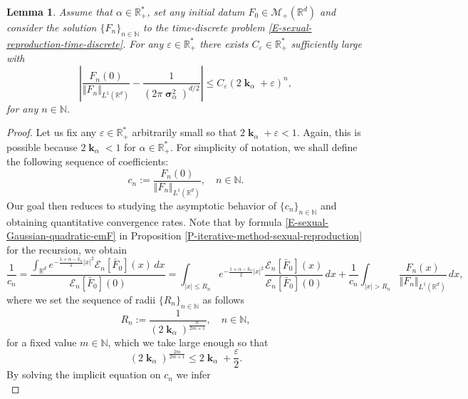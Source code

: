 \documentclass[reqno]{amsart}
\newtheorem{lemma}[definition]{Lemma}
\DeclareMathOperator{\bsigma}{\boldsymbol{\sigma}}
\DeclareMathOperator{\bk}{\boldsymbol{k}}
\numberwithin{equation}{section}
\begin{document}
{\begin{lemma}\label{L-convergence-ratios-max-mass}
Assume that $\alpha\in \mathbb{R}_+^*$, set any initial datum $F_0\in \mathcal{M}_+(\mathbb{R}^d)$ and consider the solution $\{F_n\}_{n\in \mathbb{N}}$ to the time-discrete problem \eqref{E-sexual-reproduction-time-discrete}. For any $\varepsilon\in \mathbb{R}_+^*$ there exists $C_\varepsilon\in \mathbb{R}_+^*$ sufficiently large with
\begin{equation}\label{E-convergence-ratios-max-mass}
\left\vert \frac{F_n(0)}{\Vert F_n\Vert_{L^1(\mathbb{R}^d)}}-\frac{1}{(2\pi\bsigma_\alpha^2)^{d/2}}\right\vert\leq C_\varepsilon(2\bk_\alpha+\varepsilon)^n,
\end{equation}
for any $n\in \mathbb{N}$.
\end{lemma}

\begin{proof}
Let us fix any $\varepsilon\in \mathbb{R}_+^*$ arbitrarily small so that $2\bk_\alpha+\varepsilon<1$. Again, this is possible because $2\bk_\alpha<1$ for $\alpha\in \mathbb{R}_+^*$. For simplicity of notation, we shall define the following sequence of coefficients:
$$
c_n:=\frac{F_n(0)}{\Vert F_n\Vert_{L^1(\mathbb{R}^d)}},\quad n\in \mathbb{N}.
$$
Our goal then reduces to studying the asymptotic behavior of $\{c_n\}_{n\in \mathbb{N}}$ and obtaining quantitative convergence rates. Note that by formula \eqref{E-sexual-Gaussian-quadratic-emF} in Proposition \ref{P-iterative-method-sexual-reproduction} for the recursion, we obtain
$$\frac{1}{c_n}=\frac{\int_{\mathbb{R}^d}e^{-\frac{1+\alpha-k_n}{2}\vert x\vert^2}\mathcal{E}_n[\bar F_0](x)\,dx}{\mathcal{E}_n[\bar F_0](0)}=\displaystyle\int_{\vert x\vert\leq R_n}e^{-\frac{1+\alpha-k_n}{2}\vert x\vert^2}\frac{\mathcal{E}_n[\bar F_0](x)}{\mathcal{E}_n[\bar F_0](0)}\,dx+\frac{1}{c_n}\int_{\vert x\vert>R_n}\frac{F_n(x)}{\Vert F_n\Vert_{L^1(\mathbb{R}^d)}}\,dx,$$
where we set the sequence of radii $\{R_n\}_{n\in \mathbb{N}}$ as follows
\begin{equation}\label{E-convergence-ratios-max-mass-radius}
R_n:=\frac{1}{(2\bk_\alpha)^{\frac{n}{2m+1}}},\quad n\in\mathbb{N},
\end{equation}
for a fixed value $m\in \mathbb{N}$, which we take large enough so that
\begin{equation}\label{E-convergence-ratios-max-mass-radius-choice-m}
(2\bk_\alpha)^\frac{2m}{2m+1}\leq 2\bk_\alpha+\frac{\varepsilon}{2}.
\end{equation}
By solving the implicit equation on $c_n$ we infer
\begin{equation}\label{E-convergence-ratios-max-mass-decomposition}

\end{equation}
\end{proof}}
\end{document}
